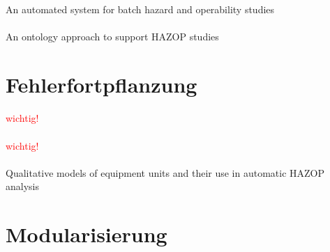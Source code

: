\paragraph*{\cite{Palmer_2009}} An automated system for batch hazard and operability studies

\paragraph*{\cite{Batres_2004}} An ontology approach to support HAZOP studies

\section{Fehlerfortpflanzung}
\paragraph*{\cite{Parmar_1987}} \textcolor{red}{wichtig!}

\paragraph*{\cite{Parmar_1987a}} \textcolor{red}{wichtig!}

\paragraph*{\cite{Bartolozzi_2000}} Qualitative models of equipment units and their use in automatic {HAZOP} analysis


\section{Modularisierung}
